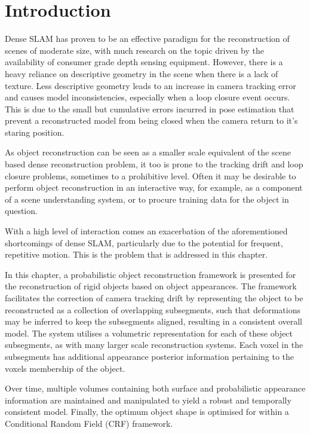 
\section{Introduction}
\label{sec:probobj_introduction}
Dense SLAM has proven to be an effective paradigm for the reconstruction of 
scenes of moderate size, with much research on the topic driven by the 
availability of consumer grade depth sensing equipment. However, there is a 
heavy reliance on descriptive geometry in the scene when there is a lack of 
texture. Less descriptive geometry leads to an increase in camera tracking 
error and causes model inconsistencies, especially when a loop closure event 
occurs. This is due to the small but cumulative errors incurred in pose 
estimation that prevent a reconstructed model from being closed when the 
camera return to it's staring position.

As object reconstruction can be seen as a smaller scale equivalent of the scene
based dense reconstruction problem, it too is prone to the tracking drift and
loop closure problems, sometimes to a prohibitive level. Often it may be
desirable to perform object reconstruction in an interactive way, for example,
as a component of a scene understanding system, or to procure training data for
the object in question.

With a high level of interaction comes an exacerbation of the aforementioned
shortcomings of dense SLAM, particularly due to the potential for frequent,
repetitive motion. This is the problem that is addressed in this chapter.

In this chapter, a probabilistic object reconstruction framework is presented
for the reconstruction of rigid objects based on object appearances.
The framework facilitates the correction of camera tracking drift by
representing the object to be reconstructed as a collection of overlapping
subsegments, such that deformations may be inferred to keep the subsegments
aligned, resulting in a consistent overall model. The system utilises a
volumetric representation for each of these object subsegments, as with many
larger scale reconstruction systems. Each voxel in the subsegments has
additional appearance posterior information pertaining to the voxels membership
of the object.

Over time, multiple volumes containing both surface and probabilistic appearance
information are maintained and manipulated to yield a robust and temporally
consistent model. Finally, the optimum object shape is optimised for within a 
Conditional Random Field (CRF) \cite{BishopPRML} framework.

